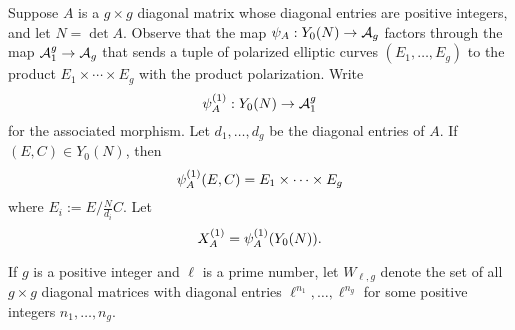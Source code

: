 \documentclass{amsart}
\begin{document}
Suppose $A$ is a $g \times g$ diagonal matrix whose diagonal entries are positive integers, and let $N = \det A$. Observe that the map $\psi_{A}: Y_0(N) \to \mathcal{A}_g$ factors through the map $\mathcal{A}_1^g \to \mathcal{A}_g$ that sends a tuple of polarized elliptic curves $(E_1,\dots,E_g)$ to the product $E_1 \times \cdots \times E_g$ with the product polarization. Write
\[
\psi_{A}^{(1)}: Y_0(N) \to \mathcal{A}_1^g
\]
for the associated morphism. Let $d_1, \ldots, d_g$ be the diagonal entries of $A$. If $(E, C) \in Y_0(N)$, then
\[
  \psi_{A}^{(1)}(E,C) = E_1 \times \cdots \times E_g
\]
where  $E_i := E/\frac{N}{d_i}C$.
Let $$X^{(1)}_A = \psi_{A}^{(1)}(Y_0(N)).$$

  If $g$ is a positive integer and $\ell$ is a prime number, let $W_{\ell,g}$ denote the set of all $g \times g$ diagonal matrices with diagonal entries $\ell^{n_1},\dots,\ell^{n_g}$ for some positive integers $n_1,\dots,n_g$. 
\end{document}

